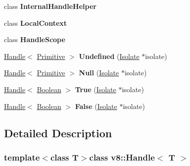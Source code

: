 \begin{DoxyCompactItemize}
\item 
\hypertarget{classv8_1_1_handle_a4d886c8e6d4c47ae9d59f6d878048580}{}class {\bfseries Internal\+Handle\+Helper}\label{classv8_1_1_handle_a4d886c8e6d4c47ae9d59f6d878048580}

\item 
\hypertarget{classv8_1_1_handle_ae34f528093f2fad464ce37f6e64c763d}{}class {\bfseries Local\+Context}\label{classv8_1_1_handle_ae34f528093f2fad464ce37f6e64c763d}

\item 
\hypertarget{classv8_1_1_handle_a5f127e488db492b05c8542cec0b880b7}{}class {\bfseries Handle\+Scope}\label{classv8_1_1_handle_a5f127e488db492b05c8542cec0b880b7}

\item 
\hypertarget{classv8_1_1_handle_a54e0b3d94c2292e9f7d4fc1618ecfdd6}{}\hyperlink{classv8_1_1_handle}{Handle}$<$ \hyperlink{classv8_1_1_primitive}{Primitive} $>$ {\bfseries Undefined} (\hyperlink{classv8_1_1_isolate}{Isolate} $\ast$isolate)\label{classv8_1_1_handle_a54e0b3d94c2292e9f7d4fc1618ecfdd6}

\item 
\hypertarget{classv8_1_1_handle_a495be557de6f0ea3848a2e8fc6505577}{}\hyperlink{classv8_1_1_handle}{Handle}$<$ \hyperlink{classv8_1_1_primitive}{Primitive} $>$ {\bfseries Null} (\hyperlink{classv8_1_1_isolate}{Isolate} $\ast$isolate)\label{classv8_1_1_handle_a495be557de6f0ea3848a2e8fc6505577}

\item 
\hypertarget{classv8_1_1_handle_a29e5558f47ee7c44b54dc3c20eaceb32}{}\hyperlink{classv8_1_1_handle}{Handle}$<$ \hyperlink{classv8_1_1_boolean}{Boolean} $>$ {\bfseries True} (\hyperlink{classv8_1_1_isolate}{Isolate} $\ast$isolate)\label{classv8_1_1_handle_a29e5558f47ee7c44b54dc3c20eaceb32}

\item 
\hypertarget{classv8_1_1_handle_af328581ad265dc321eb55a587708eedc}{}\hyperlink{classv8_1_1_handle}{Handle}$<$ \hyperlink{classv8_1_1_boolean}{Boolean} $>$ {\bfseries False} (\hyperlink{classv8_1_1_isolate}{Isolate} $\ast$isolate)\label{classv8_1_1_handle_af328581ad265dc321eb55a587708eedc}

\end{DoxyCompactItemize}


\subsection{Detailed Description}
\subsubsection*{template$<$class T$>$class v8\+::\+Handle$<$ T $>$}

